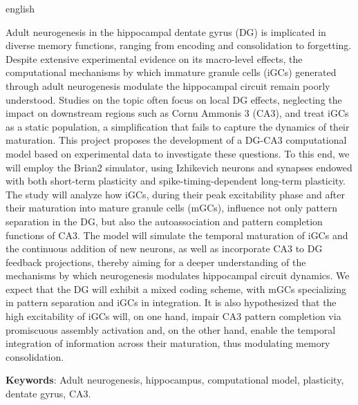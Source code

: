 \begin{resumo}[Abstract]
\begin{otherlanguage*}{english}
  
Adult neurogenesis in the hippocampal dentate gyrus (DG) is implicated in diverse memory functions, ranging from encoding and
consolidation to forgetting. Despite extensive experimental evidence on its macro-level effects, the computational mechanisms by
which immature granule cells (iGCs) generated through adult neurogenesis modulate the hippocampal circuit remain poorly
understood. Studies on the topic often focus on local DG effects, neglecting the impact on downstream regions such as Cornu
Ammonis 3 (CA3), and treat iGCs as a static population, a simplification that fails to capture the dynamics of their maturation.
This project proposes the development of a DG-CA3 computational model based on experimental data to investigate these questions.
To this end, we will employ the Brian2 simulator, using Izhikevich neurons and synapses endowed with both short-term plasticity
and spike-timing-dependent long-term plasticity. The study will analyze how iGCs, during their peak excitability phase and after
their maturation into mature granule cells (mGCs), influence not only pattern separation in the DG, but also the autoassociation
and pattern completion functions of CA3. The model will simulate the temporal maturation of iGCs and the continuous addition of
new neurons, as well as incorporate CA3 to DG feedback projections, thereby aiming for a deeper understanding of the mechanisms by
which neurogenesis modulates hippocampal circuit dynamics. We expect that the DG will exhibit a mixed coding scheme, with mGCs
specializing in pattern separation and iGCs in integration. It is also hypothesized that the high excitability of iGCs will, on
one hand, impair CA3 pattern completion via promiscuous assembly activation and, on the other hand, enable the temporal
integration of information across their maturation, thus modulating memory consolidation.

\noindent \textbf{Keywords}: Adult neurogenesis, hippocampus, computational model, plasticity, dentate gyrus, CA3.
\end{otherlanguage*}
\end{resumo}



